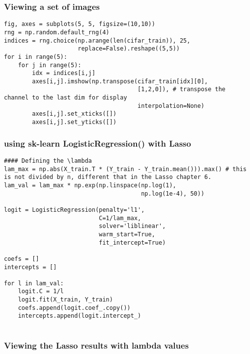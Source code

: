 \documentclass[
  letterpaper,
  DIV=11,
  numbers=noendperiod]{scrreprt}
\begin{document}
\subsubsection{Viewing a set of images}\label{viewing-a-set-of-images}

\begin{verbatim}
fig, axes = subplots(5, 5, figsize=(10,10))
rng = np.random.default_rng(4)
indices = rng.choice(np.arange(len(cifar_train)), 25,
                     replace=False).reshape((5,5))
for i in range(5):
    for j in range(5):
        idx = indices[i,j]
        axes[i,j].imshow(np.transpose(cifar_train[idx][0],
                                      [1,2,0]), # transpose the channel to the last dim for display 
                                      interpolation=None)
        axes[i,j].set_xticks([])
        axes[i,j].set_yticks([])
\end{verbatim}

\subsubsection{using sk-learn LogisticRegression() with
Lasso}\label{using-sk-learn-logisticregression-with-lasso}

\begin{verbatim}
#### Defining the \lambda
lam_max = np.abs(X_train.T * (Y_train - Y_train.mean())).max() # this is not divided by n, different that in the Lasso chapter 6. 
lam_val = lam_max * np.exp(np.linspace(np.log(1),
                                       np.log(1e-4), 50))
                                       
logit = LogisticRegression(penalty='l1', 
                           C=1/lam_max,
                           solver='liblinear',
                           warm_start=True,
                           fit_intercept=True)
                           
coefs = []
intercepts = []

for l in lam_val:
    logit.C = 1/l
    logit.fit(X_train, Y_train)
    coefs.append(logit.coef_.copy())
    intercepts.append(logit.intercept_)   
    
\end{verbatim}

\subsubsection{Viewing the Lasso results with lambda
values}\label{viewing-the-lasso-results-with-lambda-values}
\end{document}
